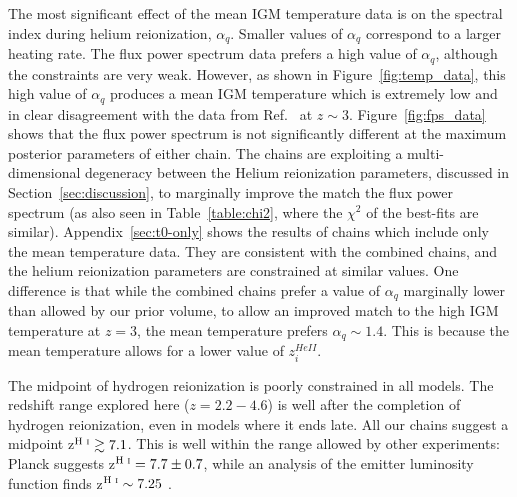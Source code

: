 The most significant effect of the mean IGM temperature data is on the spectral index during helium reionization, $\alpha_q$. Smaller values of $\alpha_q$ correspond to a larger heating rate. The flux power spectrum data prefers a high value of $\alpha_q$, although the constraints are very weak. However, as shown in Figure~\ref{fig:temp_data}, this high value of $\alpha_q$ produces a mean IGM temperature which is extremely low and in clear disagreement with the data from Ref.~\cite{2021MNRAS.506.4389G} at $z\sim 3$. Figure~\ref{fig:fps_data} shows that the flux power spectrum is not significantly different  at the maximum posterior parameters of either chain. The chains are exploiting a multi-dimensional degeneracy between the Helium reionization parameters, discussed in Section~\ref{sec:discussion}, to marginally improve the match the flux power spectrum (as also seen in Table~\ref{table:chi2}, where the $\chi^2$ of the best-fits are similar). Appendix~\ref{sec:t0-only} shows the results of chains which include only the mean temperature data. They are consistent with the combined chains, and the helium reionization parameters are constrained at similar values. One difference is that while the combined chains prefer a value of $\alpha_q$ marginally lower than allowed by our prior volume, to allow an improved match to the high IGM temperature at $z=3$, the mean temperature prefers $\alpha_q \sim 1.4$. This is because the mean temperature allows for a lower value of $z_i^{HeII}$.


The midpoint of hydrogen reionization is poorly constrained in all models. The redshift range explored here ($z=2.2-4.6$) is well after the completion of hydrogen reionization, even in models where it ends late.
All our chains suggest a midpoint z$^{\text{H~{\sc i}}} \gtrsim 7.1$. This is well within the range allowed by other experiments: Planck suggests z$^{\text{H~{\sc i}}} = 7.7 \pm 0.7$, while an analysis of the \Lya emitter luminosity function finds z$^{\text{H~{\sc i}}} \sim 7.25$ \cite{2021ApJ...919..120M}.

